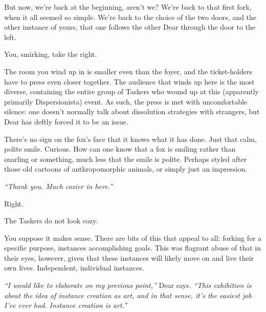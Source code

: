 \newpage
\null
\newpage
\null
\newpage

\null
\vfill

But now, we're back at the beginning, aren't we? We're back to that first fork, when it all seemed so simple. We're back to the choice of the two doors, and the other instance of yours, that one follows the other Dear through the door to the left.

You, smirking, take the right.

The room you wind up in is smaller even than the foyer, and the ticket-holders have to press even closer together. The audience that winds up here is the most diverse, containing the entire group of Taskers who wound up at this (apparently primarily Dispersionista) event. As such, the press is met with uncomfortable silence: one doesn't normally talk about dissolution strategies with strangers, but Dear has deftly forced it to be an issue.

There's no sign on the fox's face that it knows what it has done. Just that calm, polite smile. Curious. How can one know that a fox is smiling rather than snarling or something, much less that the smile is polite. Perhaps styled after those old cartoons of anthropomorphic animals, or simply just an impression.

\emph{``Thank you. Much cozier in here.''}

\vfill

\newpage

\null
\vfill

Right.

\null
\vfill

\begin{flushright}
  {\footnotesize The Taskers do not look cozy.}
\end{flushright}

\newpage

\null
\vfill

You suppose it makes sense. There are bits of this that appeal to all: forking for a specific purpose, instances accomplishing goals. This was flagrant abuse of that in their eyes, however, given that these instances will likely move on and live their own lives. Independent, individual instances.

\emph{``I would like to elaborate on my previous point,''} Dear says. \emph{``This exhibition is about the idea of instance creation as art, and in that sense, it's the easiest job I've ever had. Instance creation is art.''}

